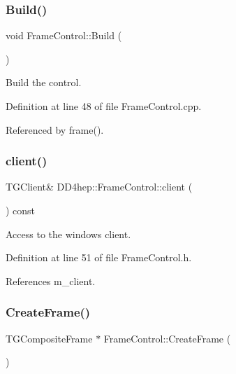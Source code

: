 \subsubsection{\texorpdfstring{Build()}{Build()}}
{\footnotesize\ttfamily void Frame\+Control\+::\+Build (\begin{DoxyParamCaption}{ }\end{DoxyParamCaption})\hspace{0.3cm}{\ttfamily [virtual]}}



Build the control. 



Definition at line 48 of file Frame\+Control.\+cpp.



Referenced by frame().

\hypertarget{class_d_d4hep_1_1_frame_control_a875fe567aff91495ac78358850acf062}{}\label{class_d_d4hep_1_1_frame_control_a875fe567aff91495ac78358850acf062} 
\subsubsection{\texorpdfstring{client()}{client()}}
{\footnotesize\ttfamily T\+G\+Client\& D\+D4hep\+::\+Frame\+Control\+::client (\begin{DoxyParamCaption}{ }\end{DoxyParamCaption}) const\hspace{0.3cm}{\ttfamily [inline]}}



Access to the windows client. 



Definition at line 51 of file Frame\+Control.\+h.



References m\+\_\+client.

\hypertarget{class_d_d4hep_1_1_frame_control_a3622593e0da13ddc3719d845782ec7be}{}\label{class_d_d4hep_1_1_frame_control_a3622593e0da13ddc3719d845782ec7be} 
\subsubsection{\texorpdfstring{Create\+Frame()}{CreateFrame()}}
{\footnotesize\ttfamily T\+G\+Composite\+Frame $\ast$ Frame\+Control\+::\+Create\+Frame (\begin{DoxyParamCaption}{ }\end{DoxyParamCaption})\hspace{0.3cm}{\ttfamily [virtual]}}



